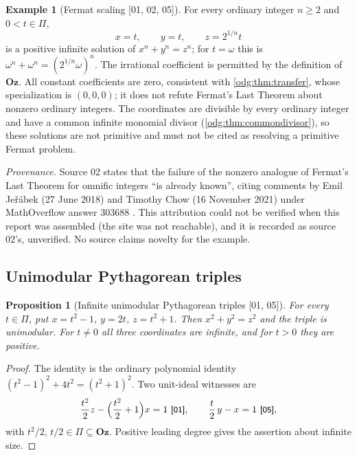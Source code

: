\documentclass[11pt,oneside]{article}
\numberwithin{equation}{section}
\newtheorem{proposition}[proposition]{Proposition}
\theoremstyle{definition}
\newtheorem{example}[example]{Example}
\theoremstyle{remark}
\newcommand{\Oz}{\mathbf{Oz}}
\newcommand{\src}[1]{\textup{\textsf{\small[#1]}}}
\newcommand{\status}[1]{\par\smallskip\noindent\textit{Provenance.} #1\par\smallskip}
\begin{document}
\begin{example}[Fermat scaling \src{01, 02, 05}]\label{odg:ex:fermatscaling}
For every ordinary integer $n\geq2$ and $0<t\in\Pi$,
\begin{equation}\label{odg:eq:fermatscaling}
 x=t,\qquad y=t,\qquad z=2^{1/n}t
\end{equation}
is a positive infinite solution of $x^n+y^n=z^n$; for $t=\omega$ this is
$\omega^n+\omega^n=(2^{1/n}\omega)^n$. The irrational coefficient is
permitted by the definition of $\Oz$. All constant coefficients are zero,
consistent with \cref{odg:thm:transfer}, whose specialization is $(0,0,0)$;
it does not refute Fermat's Last Theorem about nonzero ordinary integers. The
coordinates are divisible by every ordinary integer and have a common
infinite monomial divisor (\cref{odg:thm:commondivisor}), so these solutions
are not primitive and must not be cited as resolving a primitive Fermat
problem.
\end{example}

\status{Source 02 states that the failure of the nonzero analogue of
Fermat's Last Theorem for omnific integers ``is already known'', citing
comments by Emil Je\v r\'abek (27 June 2018) and Timothy Chow (16 November
2021) under MathOverflow answer 303688 \cite{MOFermat}. This attribution
could not be verified when this report was assembled (the site was not
reachable), and it is recorded as source 02's, unverified. No source claims
novelty for the example.}

\subsection{Unimodular Pythagorean triples}

\begin{proposition}[Infinite unimodular Pythagorean triples \src{01, 05}]\label{odg:prop:pythagoras}
For every $t\in\Pi$, put $x=t^2-1$, $y=2t$, $z=t^2+1$. Then
$x^2+y^2=z^2$ and the triple is unimodular. For $t\ne0$ all three
coordinates are infinite, and for $t>0$ they are positive.
\end{proposition}
\begin{proof}
The identity is the ordinary polynomial identity
$(t^2-1)^2+4t^2=(t^2+1)^2$. Two unit-ideal witnesses are
\begin{equation}\label{odg:eq:pythbezout}
 \frac{t^2}{2}z-\Bigl(\frac{t^2}{2}+1\Bigr)x=1\ \src{01},\qquad
 \frac t2\,y-x=1\ \src{05},
\end{equation}
with $t^2/2,\,t/2\in\Pi\subseteq\Oz$. Positive leading degree gives the
assertion about infinite size.
\end{proof}
\end{document}
